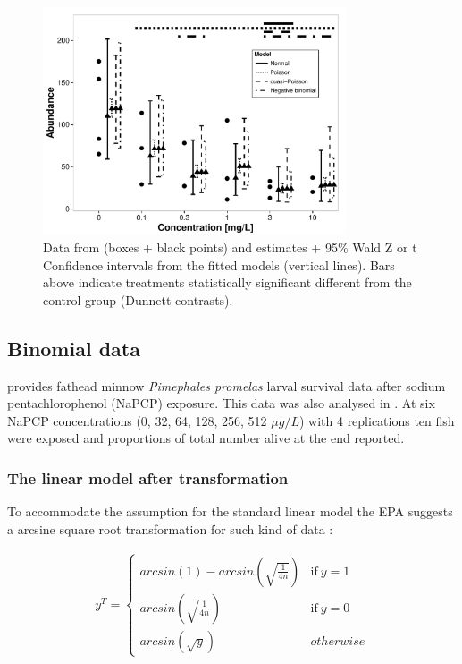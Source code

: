 \documentclass{scrartcl}
\begin{document}
\begin{figure}
  \centering
  \includegraphics[width = 0.8\textwidth]{example.pdf}
  \caption{Data from \citet{brock_minimum_2014} (boxes + black points) and estimates + 95\% Wald Z or t Confidence intervals from the fitted models (vertical lines). 
  Bars above indicate treatments statistically significant different from the control group (Dunnett contrasts).}
  \label{fig:example}
\end{figure}

\subsection{Binomial data}
\citet{weber_short-term_1989} provides fathead minnow \textit{Pimephales promelas} larval survival data after sodium pentachlorophenol (NaPCP) exposure.
This data was also analysed in \citet{newman_quantitative_2012}.
At six NaPCP concentrations (0, 32, 64, 128, 256, 512 $\mu g / L$) with 4 replications ten fish were exposed and proportions of total number alive at the end reported.

\subsubsection{The linear model after transformation}
To accommodate the assumption for the standard linear model the EPA suggests a arcsine square root transformation for such kind of data \cite{epa_methods_2002}:

$$\begin{aligned}
  y^T = 
  \begin{cases}  
    arcsin(1) - arcsin(\sqrt{\frac{1}{4n}}) & \text{if}\ y = 1 \\
    arcsin(\sqrt{\frac{1}{4n}}) & \text{if}\ y = 0 \\
    arcsin(\sqrt{y}) & otherwise
  \end{cases}
\end{aligned}$$
\end{document}
